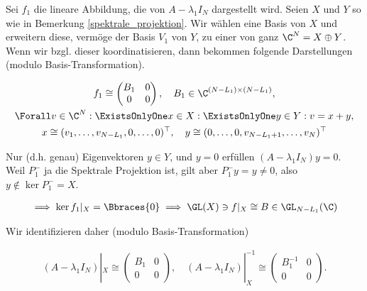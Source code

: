 \begin{remark} \label{semi_inverse}

    Sei $f_1$ die lineare Abbildung, die von $A - \lambda_1 I_N$ dargestellt wird.
    Seien $X$ und $Y$ so wie in Bemerkung \ref{spektrale_projektion}.
    Wir wählen eine Basis von $X$ und erweitern diese, vermöge der Basis $V_1$ von $Y$, zu einer von ganz $\C^N = X \oplus Y$.
    Wenn wir bzgl. dieser koordinatisieren, dann bekommen folgende Darstellungen (modulo Basis-Transformation).

    \begin{gather*}
        f_1
        \cong
        \begin{pmatrix}
            B_1 & 0 \\
            0   & 0
        \end{pmatrix},
        \quad
        B_1 \in \C^{(N - L_1) \times (N - L_1)}, \\
        \Forall v \in \C^N:
            \ExistsOnlyOne x \in X:
            \ExistsOnlyOne y \in Y:
                v = x + y, \\
        x
        \cong
        (
            v_1, \dots, v_{N - L_1},
            0, \dots, 0
        )^\top,
        \quad
        y
        \cong
        (
            0, \dots, 0,
            v_{N - L_1 + 1}, \dots, v_N
        )^\top
    \end{gather*}

    Nur (d.h. genau) Eigenvektoren $y \in Y$, und $y = 0$ erfüllen $(A - \lambda_1 I_N) y = 0$.
    Weil $P_1^-$ ja die Spektrale Projektion ist, gilt aber $P_1^- y = y \neq 0$, also $y \not \in \ker P_1^- = X$.

    \begin{align*}
        \implies
        \ker f_1 |_X = \Bbraces{0}
        \implies
        \GL(X) \ni f |_X \cong B \in \GL_{N - L_1}(\C)
    \end{align*}

    Wir identifizieren daher (modulo Basis-Transformation)

    \begin{align*}
        (A - \lambda_1 I_N) |_X
        \cong
        \begin{pmatrix}
            B_1 & 0 \\ 0 & 0
        \end{pmatrix},
        \quad
        (A - \lambda_1 I_N) |_X^{-1}
        \cong
        \begin{pmatrix}
            B_1^{-1} & 0 \\ 0 & 0
        \end{pmatrix}.
    \end{align*}

\end{remark}